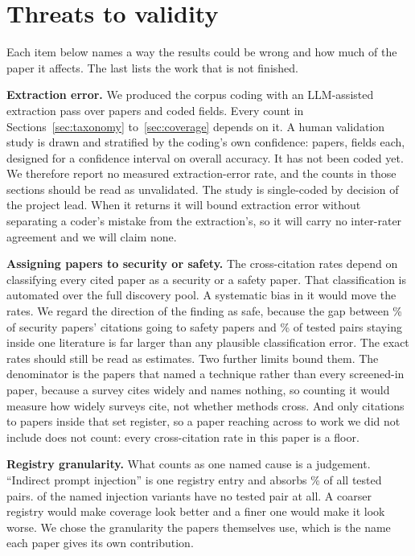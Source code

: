 \section{Threats to validity}
\label{sec:threats}

Each item below names a way the results could be wrong and how much of the paper it affects. The last lists the work that is not finished.

\textbf{Extraction error.} We produced the corpus coding with an LLM-assisted
extraction pass over \NCorpus{} papers and \NCodedFields{} coded fields. Every count in
Sections~\ref{sec:taxonomy} to~\ref{sec:coverage} depends on it. A human validation study is drawn and
stratified by the coding's own confidence: \NValidationDraw{} papers,
\NValidationFields{} fields each, designed for a \NValidationCI{}\pp{}
confidence interval on overall accuracy. It has not been coded yet.
We therefore report no measured extraction-error rate, and the counts in those
sections should be read as unvalidated. The study is single-coded by decision
of the project lead. When it returns it will bound extraction error without
separating a coder's mistake from the extraction's, so it will carry no
inter-rater agreement and we will claim none.

\textbf{Assigning papers to security or safety.} The cross-citation rates depend on classifying every
cited paper as a security or a safety paper. That classification is automated over the full
discovery pool. A systematic bias in it would move the rates. We regard the
direction of the finding as safe, because the gap between \PctEdgeSecCross{}\% of
security papers' citations going to safety papers and \PctSameRegime{}\% of
tested pairs staying inside one literature is far larger than any plausible
classification error. The exact rates should still be read as estimates. Two further limits
bound them. The denominator is the \NAnalysed{} papers that named a
technique rather than every screened-in paper, because a survey cites
widely and names nothing, so counting it would measure how widely surveys cite, not whether methods
cross. And
only citations to papers inside that set register, so a paper reaching
across to work we did not include does not count: every cross-citation rate
in this paper is a floor.

\textbf{Registry granularity.} What counts as one named cause is a
judgement. ``Indirect prompt injection'' is one registry entry and absorbs
\PctTopMechShare{}\% of all tested pairs. \NInjUncovered{} of the \NInjVariants{} named injection
variants have no tested pair at all. A
coarser registry would make coverage look better and a finer one would make it
look worse. We chose the granularity the papers themselves use, which is the
name each paper gives its own contribution.

